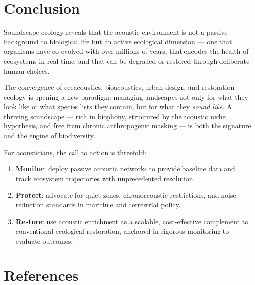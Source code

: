 \documentclass[12pt, a4paper]{article}
\begin{document}
\newpage

\section*{Conclusion}

Soundscape ecology reveals that the acoustic environment is not a passive background to
biological life but an active ecological dimension --- one that organisms have co-evolved with
over millions of years, that encodes the health of ecosystems in real time, and that can be
degraded or restored through deliberate human choices.

The convergence of ecoacoustics, bioacoustics, urban design, and restoration ecology is opening
a new paradigm: managing landscapes not only for what they look like or what species lists they
contain, but for what they \textit{sound like}. A thriving soundscape --- rich in biophony,
structured by the acoustic niche hypothesis, and free from chronic anthropogenic masking --- is
both the signature and the engine of biodiversity.

For acousticians, the call to action is threefold:
\begin{enumerate}[itemsep=4pt]
  \item \textbf{Monitor}: deploy passive acoustic networks to provide baseline data and
        track ecosystem trajectories with unprecedented resolution.
  \item \textbf{Protect}: advocate for quiet zones, chronoacoustic restrictions, and
        noise-reduction standards in maritime and terrestrial policy.
  \item \textbf{Restore}: use acoustic enrichment as a scalable, cost-effective complement
        to conventional ecological restoration, anchored in rigorous monitoring to evaluate
        outcomes.
\end{enumerate}

\newpage
\section*{References}
\end{document}

